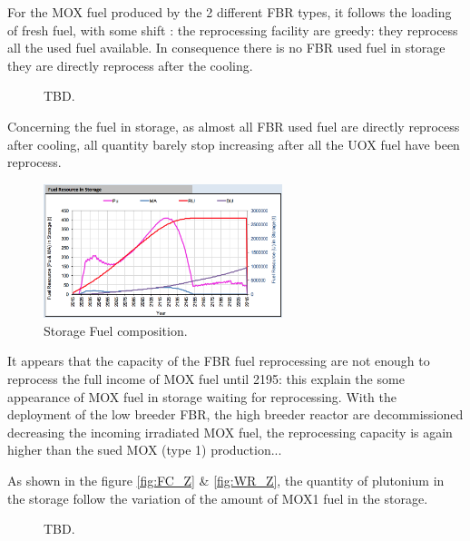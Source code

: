 \documentclass[12pt]{article}
\begin{document}
For the MOX fuel produced by the 2 different FBR
types, it follows the loading of fresh fuel, with
some shift : the reprocessing facility are greedy:
they reprocess all the used fuel available. In
consequence there is no FBR used fuel in storage
they are directly reprocess after the cooling.


\begin{figure}[h!]
\centering
{}
\caption{TBD.\label{fig:cool_reprocc} }
\end{figure}


Concerning the fuel in storage, as almost all FBR
used fuel are directly reprocess after cooling,
all quantity barely stop increasing after all the
UOX fuel have been reprocess.

\begin{figure}[h!]
\centering
\includegraphics[width=0.62\textwidth]{img/FuelInStorage_1}
\caption{Storage Fuel composition.}
\label{fig:storagecompo_1}
\end{figure}

It appears that the capacity of the FBR fuel
reprocessing are not enough to reprocess the full
income of MOX fuel until 2195: this explain the
some appearance of MOX fuel in storage waiting for
reprocessing. With the deployment of the low
breeder FBR, the high breeder reactor are
decommissioned decreasing the incoming irradiated
MOX fuel,  the reprocessing capacity is again
higher than the sued MOX (type 1) production...


As shown in the figure \ref{fig:FC_Z} \&
\ref{fig:WR_Z}, the quantity of plutonium in the
storage follow the variation of the amount of MOX1
fuel in the storage.

\begin{figure}[h!]
\centering
{}
\caption{TBD.\label{fig:FC_WR_zoom} }
\end{figure}
\end{document}
